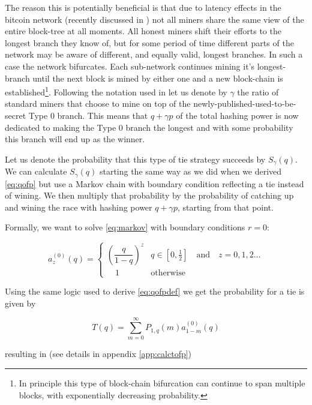 \documentclass[letterpaper,12pt]{report}
\theoremstyle{plain}
\theoremstyle{definition}
\begin{document}
The reason this is potentially beneficial is that due to latency effects in the bitcoin network (recently discussed in \cite{Zoharetal}) not all miners share the same view of the entire block-tree at all moments. All honest miners shift their efforts to the longest branch they know of, but for some period of time different parts of the network may be aware of different, and equally valid, longest branches. In such a case the network bifurcates. Each sub-network continues mining it's longest-branch until the next block is mined by either one and a new block-chain is established\footnote{In principle this type of block-chain bifurcation can continue to span multiple blocks, with exponentially decreasing probability.}. 
Following the notation used in \cite{Selfish} let us denote by $\gamma$ the ratio of standard miners that choose to mine on top of the newly-published-used-to-be-secret Type 0 branch.
This means that $q+\gamma p$ of the total hashing power is now dedicated to making the Type 0 branch the longest and with some probability this branch will end up as the winner. 

Let us denote the probability that this type of tie strategy succeeds by $S_{\gamma}(q)$.
We can calculate $S_{\gamma}(q)$ starting the same way as we did when we derived \ref{eq:qofp} but use a Markov chain with boundary condition reflecting a tie instead of wining. We then multiply that probability by the probability of catching up and wining the race with hashing power $q+\gamma p$, starting from that point.

Formally, we want to solve \ref{eq:markov} with boundary conditions $r=0$:

\begin{equation}\label{eq:bz}
\mathit{a}_z^{(0)}(q)=\begin{cases}\left( \dfrac{q}{1-q}\right)^z & q\in [0,\frac{1}{2}] \quad \mathrm{and} \quad z=0,1,2\dots \\ \quad 1 & \mathrm{otherwise} \end{cases}
\end{equation}

Using the same logic used to derive \ref{eq:qofpdef} we get the probability for a tie is given by

\begin{equation}\label{eq:qofpdef}
\mathit{T}(q)= \sum_{m=0}^{\infty}\mathit{P}_{1,q}(m)\mathit{a}^{(0)}_{1-m}(q)
\end{equation}

resulting in (see details in appendix \ref{app:calctofp})
\end{document}
